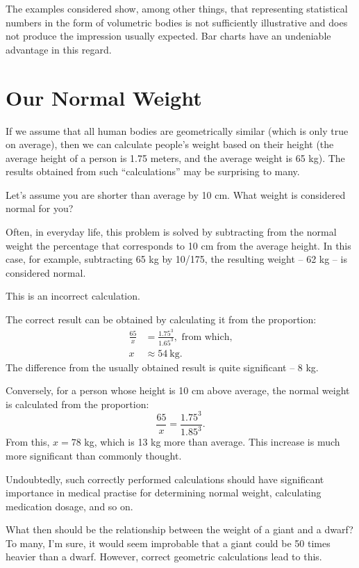 The examples considered show, among other things, that representing statistical numbers in the form of volumetric bodies is not sufficiently illustrative and does not produce the impression usually expected. Bar charts have an undeniable advantage in this regard.
\clearpage	

\section{Our Normal Weight}
\label{sec-11.13}

If we assume that all human bodies are geometrically similar (which is only true on average), then we can calculate people's weight based on their height (the average height of a person is 1.75 meters, and the average weight is 65 kg). The results obtained from such ``calculations'' may be surprising to many.

Let's assume you are shorter than average by 10 cm. What weight is considered normal for you?

Often, in everyday life, this problem is solved by subtracting from the normal weight the percentage that corresponds to 10 cm from the average height. In this case, for example, subtracting 65 kg by 10/175, the resulting weight -- 62 kg -- is considered normal.

This is an incorrect calculation.

The correct result can be obtained by calculating it from the proportion:
\begin{align*}%
\frac{65}{x} & = \frac{1.75^{3}}{1.65^{3}}, \,\, \text{from which,}\\
 x & \approx \SI{54}{\kilo\gram}.
\end{align*}
The difference from the usually obtained result is quite significant -- 8 kg.

Conversely, for a person whose height is 10 cm above average, the normal weight is calculated from the proportion:
\begin{equation*}%
\frac{65}{x} = \frac{1.75^{3}}{1.85^{3}}.
\end{equation*}
From this, \( x = 78 \) kg, which is 13 kg more than average. This increase is much more significant than commonly thought.

Undoubtedly, such correctly performed calculations should have significant importance in medical practise for determining normal weight, calculating medication dosage, and so on.

What then should be the relationship between the weight of a giant and a dwarf? To many, I'm sure, it would seem improbable that a giant could be 50 times heavier than a dwarf. However, correct geometric calculations lead to this.

